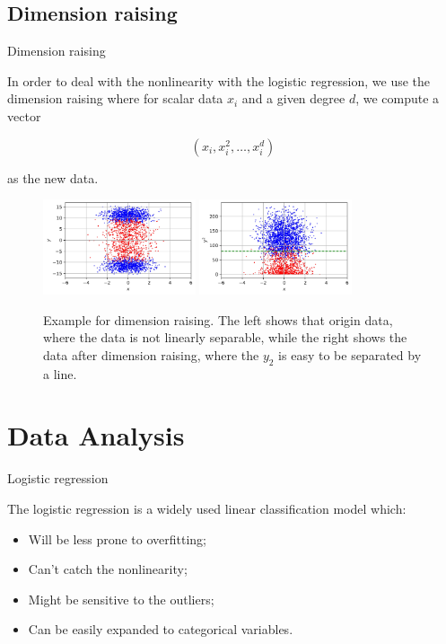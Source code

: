 \documentclass{beamer}
\begin{document}
\subsection{Dimension raising}

\begin{frame}{Dimension raising}

  In order to deal with the nonlinearity with the logistic regression, we use the dimension raising where for scalar data $x_i$ and a given degree $d$, we compute a vector

  $$
    (x_i, x_i^2, \dots, x_i^d)
  $$

  as the new data.

  \begin{figure}[H]
    \centering
    \includegraphics[width=0.4\textwidth]{./figure/Sample-Raising-1.jpg}
    \includegraphics[width=0.4\textwidth]{./figure/Sample-Raising-2.jpg}
    \caption{Example for dimension raising. The left shows that origin data, where the data is not linearly separable, while the right shows the data after dimension raising, where the $y_2$ is easy to be separated by a line.}
  \end{figure}

\end{frame}

\section{Data Analysis}

\begin{frame}{Logistic regression}

  The logistic regression is a widely used linear classification model which: \vspace{.25cm}

  \begin{itemize}
    \item Will be less prone to overfitting; \vspace{.25cm}
    \item Can't catch the nonlinearity; \vspace{.25cm}
    \item Might be sensitive to the outliers; \vspace{.25cm}
    \item Can be easily expanded to categorical variables. \vspace{.25cm}
  \end{itemize}

\end{frame}
\end{document}
